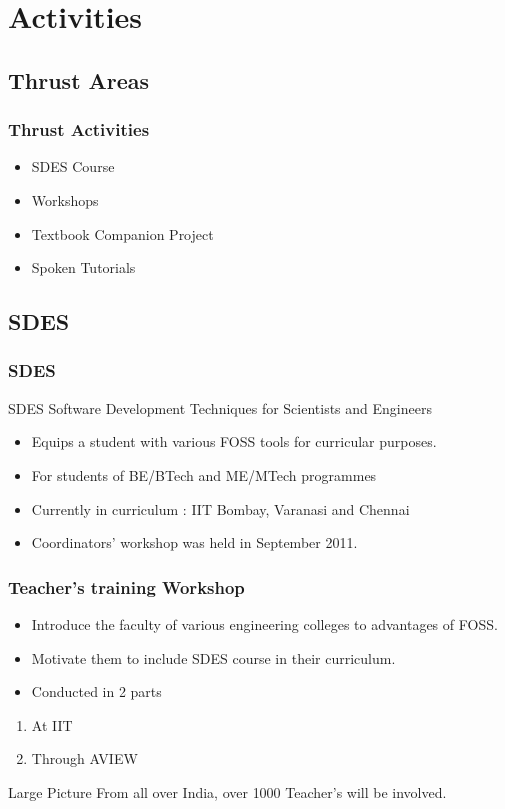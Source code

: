 \documentclass[compress,red]{beamer} %
\begin{document}
\section{Activities}

\subsection{Thrust Areas}
\begin{frame}
\frametitle{Thrust Activities}
\begin{itemize}
\item SDES Course \pause
\item Workshops  \pause
\item Textbook Companion Project  \pause
\item Spoken Tutorials \pause
\end{itemize}
\end{frame}

\subsection{SDES}
\begin{frame}
\frametitle{SDES}
\begin{block}{SDES}
Software Development Techniques for Scientists and Engineers
\end{block}
\begin{itemize}
\item Equips a student with various FOSS tools for curricular purposes.
\item For students of BE/BTech and ME/MTech programmes
\item Currently in curriculum : IIT Bombay, Varanasi and Chennai
\item Coordinators' workshop was held in September 2011.
\end{itemize}
\end{frame}

\begin{frame}
\frametitle{Teacher's training Workshop}
\begin{itemize}
\item Introduce the faculty of various engineering colleges to advantages of FOSS. \pause
\item Motivate them to include SDES course in their curriculum. \pause
\item Conducted in 2 parts \pause
\end{itemize}
\begin{enumerate}
\item At IIT
\item Through AVIEW \pause
\end{enumerate}
\begin{block}{Large Picture}
From all over India, over \alert{1000} Teacher's will be involved.
\end{block}
\end{frame}
\end{document}
